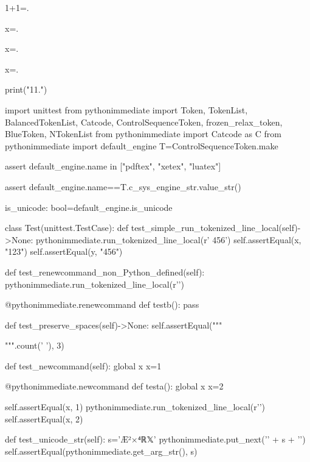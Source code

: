 \documentclass[a5paper]{article}
\begin{document}
1+1=.


x=.


x=.  %

x=.  %

\begin{pycode}
print("11.\n")
\end{pycode}

\begin{pycode}
\end{pycode}


\begin{pycode}


import unittest
from pythonimmediate import Token, TokenList, BalancedTokenList, Catcode, ControlSequenceToken, frozen_relax_token, BlueToken, NTokenList
from pythonimmediate import Catcode as C
from pythonimmediate import default_engine
T=ControlSequenceToken.make

assert default_engine.name in ["pdftex", "xetex", "luatex"]

assert default_engine.name==T.c_sys_engine_str.value_str()

is_unicode: bool=default_engine.is_unicode

class Test(unittest.TestCase):
	def test_simple_run_tokenized_line_local(self)->None:
		pythonimmediate.run_tokenized_line_local(r' {456}')
		self.assertEqual(x, "123")
		self.assertEqual(y, "456")

	def test_renewcommand_non_Python_defined(self):
		pythonimmediate.run_tokenized_line_local(r'\def \testb {}')

		@pythonimmediate.renewcommand
		def testb(): pass


	def test_preserve_spaces(self)->None:
		self.assertEqual("""
   
""".count(' '), 3)

	def test_newcommand(self):
		global x
		x=1

		@pythonimmediate.newcommand
		def testa():
			global x
			x=2

		self.assertEqual(x, 1)
		pythonimmediate.run_tokenized_line_local(r'\testa')
		self.assertEqual(x, 2)

	def test_unicode_str(self):
		s='Æ²×⁴ℝ𝕏'
		pythonimmediate.put_next('{' + s + '}')
		self.assertEqual(pythonimmediate.get_arg_str(), s)


\end{pycode}
\end{document}
